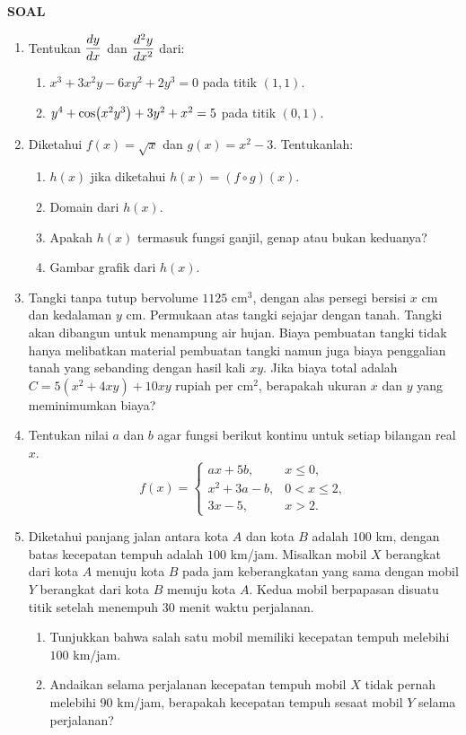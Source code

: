 \begin{center}
\textbf{\large{SOAL}}
\end{center}
\begin{enumerate}[leftmargin=*, label={\arabic*}.]
\item Tentukan $\displaystyle\frac{dy}{dx}$ dan $\displaystyle\frac{d^{2}y}{dx^{2}}$ dari:
    \begin{enumerate}[label={\alph*}.]
    \item $x^{3}+3x^{2}y-6xy^{2}+2y^{3}=0$ pada titik $(1,1)$.
    \item $y^{4}+\cos\brk*{x^{2}y^{3}}+3y^{2}+x^{2}=5$ pada titik $(0,1)$.
    \end{enumerate}
\item Diketahui $f(x)=\sqrt{x}$ dan $g(x)=x^{2}-3$. Tentukanlah:
    \begin{enumerate}[label={\alph*}.]
    \item $h(x)$ jika diketahui $h(x)=(f \circ g)(x)$.
    \item Domain dari $h(x)$.
    \item Apakah $h(x)$ termasuk fungsi ganjil, genap atau bukan keduanya?
    \item Gambar grafik dari $h(x)$.
    \end{enumerate}
\item Tangki tanpa tutup bervolume $1125$ cm$^3$, dengan alas persegi bersisi $x$ 
cm dan kedalaman $y$ cm. Permukaan atas tangki sejajar dengan tanah. Tangki akan 
dibangun untuk menampung air hujan. Biaya pembuatan tangki tidak hanya melibatkan 
material pembuatan tangki namun juga biaya penggalian tanah yang sebanding dengan 
hasil kali $xy$. Jika biaya total adalah $C=5(x^{2}+4xy)+10xy$ rupiah per cm$^2$, 
berapakah ukuran $x$ dan $y$ yang meminimumkan biaya?
\item Tentukan nilai $a$ dan $b$ agar fungsi berikut kontinu untuk setiap bilangan 
real $x$.
\[
    f(x)=
    \begin{cases}
        ax+5b, &x \leq 0,\\
        x^2+3a-b, &0 < x \leq 2,\\
        3x-5, &x > 2.
    \end{cases}
\]
\item Diketahui panjang jalan antara kota $A$ dan kota $B$ adalah $100$ km, dengan 
batas kecepatan tempuh adalah $100$ km/jam. Misalkan mobil $X$ berangkat dari kota 
$A$ menuju kota $B$ pada jam keberangkatan yang sama dengan mobil $Y$ berangkat 
dari kota $B$ menuju kota $A$. Kedua mobil berpapasan disuatu titik setelah 
menempuh 30 menit waktu perjalanan.
    \begin{enumerate}[label={\alph*}.]
    \item Tunjukkan bahwa salah satu mobil memiliki kecepatan tempuh melebihi $100$ 
    km/jam.
    \item  Andaikan selama perjalanan kecepatan tempuh mobil $X$ tidak pernah melebihi
    $90$ km/jam, berapakah kecepatan tempuh sesaat mobil $Y$ selama perjalanan?
    \end{enumerate}
\end{enumerate}


